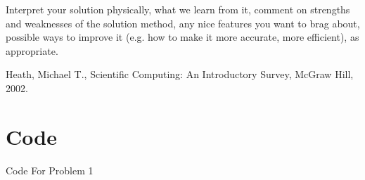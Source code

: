 \documentclass[11pt]{article}
\begin{document}
Interpret your solution physically, what we learn from it, comment on strengths and
weaknesses of the solution method, any nice features you want to brag about, 
possible ways to improve it (e.g. how to make it more accurate, more efficient), as
appropriate.
\begin{thebibliography}{100}
Heath, Michael T., Scientific Computing: An Introductory Survey, McGraw Hill, 2002.
%
%
\end{thebibliography}
\newpage
\appendix 
\setcounter{section}{0}           
\section{Code}\label{S:A}
%
Code For Problem 1
\end{document}
